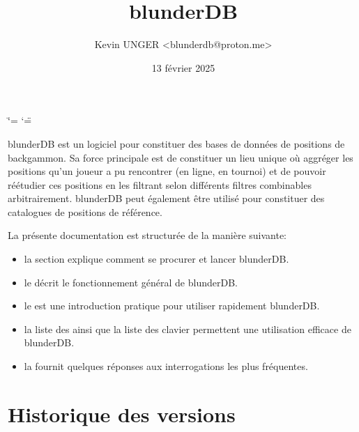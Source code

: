 \documentclass[letterpaper,10pt,french]{sphinxmanual}
\title{blunderDB}
\date{13 février 2025}
\author{Kevin UNGER \textless{}blunderdb@proton.me\textgreater{}}
\begin{document}
\ifdefined\shorthandoff
  \ifnum\catcode`\=\string=\active\shorthandoff{=}\fi
  \ifnum\catcode`\"=\active{}\fi
\fi

\pagestyle{empty}
\sphinxmaketitle
\pagestyle{plain}
\sphinxtableofcontents
\pagestyle{normal}
\label{\detokenize{index::doc}}


\sphinxAtStartPar
blunderDB est un logiciel pour constituer des bases de données de positions de
backgammon. Sa force principale est de constituer un lieu unique où aggréger
les positions qu’un joueur a pu rencontrer (en ligne, en tournoi) et de pouvoir
réétudier ces positions en les filtrant selon différents filtres combinables
arbitrairement. blunderDB peut également être utilisé pour constituer des
catalogues de positions de référence.

\sphinxAtStartPar
La présente documentation est structurée de la manière suivante:
\begin{itemize}
\item {} 
\sphinxAtStartPar
la section  explique comment se procurer et
lancer blunderDB.

\item {} 
\sphinxAtStartPar
le  décrit le fonctionnement général de blunderDB.

\item {} 
\sphinxAtStartPar
le  est une introduction pratique pour utiliser
rapidement blunderDB.

\item {} 
\sphinxAtStartPar
la liste des  ainsi que la liste des 
clavier permettent une utilisation efficace de blunderDB.

\item {} 
\sphinxAtStartPar
la  fournit quelques réponses aux interrogations les plus fréquentes.

\end{itemize}


\chapter{Historique des versions}
\label{\detokenize{index:historique-des-versions}}
\end{document}
